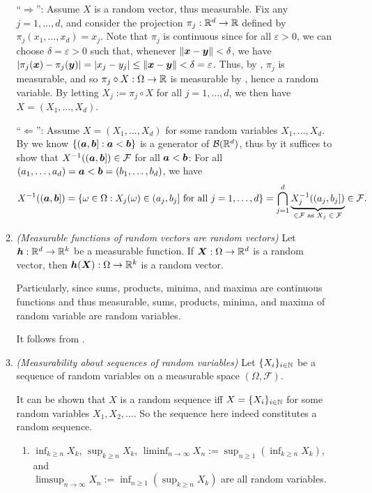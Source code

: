 \begin{enumerate}
\begin{enumerate}
\begin{pf}
``\(\Rightarrow\)'': Assume \(X\) is a random vector, thus measurable. Fix any
\(j=1,\dotsc,d\), and consider the projection \(\pi_j:\mathbb{R}^d\to\mathbb{R}\) defined by
\(\pi_j(x_1,\dotsc,x_d)=x_j\). Note that \(\pi_j\) is continuous since for all
\(\varepsilon>0\), we can choose \(\delta=\varepsilon>0\) such that, whenever
\(\|\bm{x}-\bm{y}\|<\delta\), we have
\(|\pi_{j}(\bm{x})-\pi_j(\bm{y})|=|x_j-y_j|\le\|\bm{x}-\bm{y}\|
<\delta=\varepsilon\).
Thus, by , \(\pi_j\) is measurable, and so
 \(\pi_j\circ X:\Omega\to\mathbb{R}\) is measurable by ,
hence a random variable. By letting \(X_j:=\pi_j\circ X\) for all
\(j=1,\dotsc,d\), we then have \(X=(X_1,\dotsc,X_d)\).

``\(\Leftarrow\)'': Assume \(X=(X_1,\dotsc,X_d)\) for some random variables
\(X_1,\dotsc,X_d\).  By  we know
\(\{(\bm{a},\bm{b}]:\bm{a}<\bm{b}\}\) is a generator of
\(\mathcal{B}(\mathbb{R}^d)\), thus by  it
suffices to show that \(X^{-1}((\bm{a},\bm{b}])\in\mathcal{F}\) for all
\(\bm{a}<\bm{b}\): For all
\((a_1,\dotsc,a_d)=\bm{a}<\bm{b}=(b_1,\dotsc,b_d)\), we have
\[
X^{-1}((\bm{a},\bm{b}])
=\{\omega\in\Omega:X_j(\omega)\in(a_j,b_j]\text{ for all \(j=1,\dotsc,d\)}\}
=\bigcap_{j=1}^{d}\underbrace{X_j^{-1}((a_j,b_j])}_{\in\mathcal{F}\text{ as \(X_j\in\mathcal{F}\)}}
\in\mathcal{F}.
\]
\end{pf}
\item \label{it:meas-fn-ran-vec} \emph{(Measurable functions of random vectors
are random vectors)} Let \(\bm{h}:\mathbb{R}^d\to\mathbb{R}^k\) be a measurable function. If
\(\bm{X}:\Omega\to\mathbb{R}^d\) is a random vector, then
\(\bm{h}(\bm{X}):\Omega\to\mathbb{R}^k\) is a random vector.

\begin{note}
Particularly, since sums, products, minima, and maxima are continuous functions
and thus measurable, sums, products, minima, and maxima of random variable are
random variables.
\end{note}

\begin{pf}
It follows from .
\end{pf}
\item \label{it:seq-rvs-meas} \emph{(Measurability about sequences of random variables)}
Let \(\{X_{i}\}_{i\in\mathbb{N}}\) be a sequence of random variables on a measurable
space \((\Omega,\mathcal{F})\). \begin{note}
It can be shown that \(X\) is a random sequence iff \(X=\{X_{i}\}_{i\in\mathbb{N}}\)
for some random variables \(X_1,X_2,\dotsc\). So the sequence here indeed
constitutes a random sequence.
\end{note}
\begin{enumerate}
\item \(\inf_{k\ge n}X_k\), \(\sup_{k\ge n}X_k\), \(\liminf_{n\to \infty}X_n
:=\sup_{n\ge 1}(\inf_{k\ge n}X_k)\), and \\
\(\limsup_{n\to\infty}X_n:=\inf_{n\ge 1}(\sup_{k\ge n}X_k)\) are all random
variables.


\end{enumerate}
\end{enumerate}
\end{enumerate}
